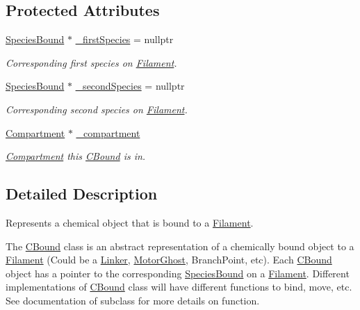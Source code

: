 \subsection*{Protected Attributes}
\begin{DoxyCompactItemize}
\item 
\hyperlink{classSpeciesBound}{Species\+Bound} $\ast$ \hyperlink{classCBound_a7ee4f44fd39c414be1f7b74b1031c1ce}{\+\_\+first\+Species} = nullptr
\begin{DoxyCompactList}\small\item\em Corresponding first species on \hyperlink{classFilament}{Filament}. \end{DoxyCompactList}\item 
\hyperlink{classSpeciesBound}{Species\+Bound} $\ast$ \hyperlink{classCBound_ae6818ab861d273598a2507be75183e41}{\+\_\+second\+Species} = nullptr
\begin{DoxyCompactList}\small\item\em Corresponding second species on \hyperlink{classFilament}{Filament}. \end{DoxyCompactList}\item 
\hyperlink{classCompartment}{Compartment} $\ast$ \hyperlink{classCBound_a95a66719b898cf32e60ae7137186bbbf}{\+\_\+compartment}
\begin{DoxyCompactList}\small\item\em \hyperlink{classCompartment}{Compartment} this \hyperlink{classCBound}{C\+Bound} is in. \end{DoxyCompactList}\end{DoxyCompactItemize}


\subsection{Detailed Description}
Represents a chemical object that is bound to a \hyperlink{classFilament}{Filament}. 

The \hyperlink{classCBound}{C\+Bound} class is an abstract representation of a chemically bound object to a \hyperlink{classFilament}{Filament} (Could be a \hyperlink{classLinker}{Linker}, \hyperlink{classMotorGhost}{Motor\+Ghost}, Branch\+Point, etc). Each \hyperlink{classCBound}{C\+Bound} object has a pointer to the corresponding \hyperlink{classSpeciesBound}{Species\+Bound} on a \hyperlink{classFilament}{Filament}. Different implementations of \hyperlink{classCBound}{C\+Bound} class will have different functions to bind, move, etc. See documentation of subclass for more details on function. 

